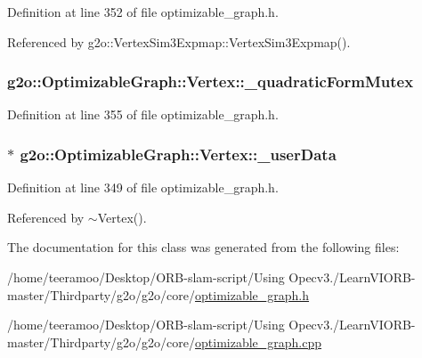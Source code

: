 Definition at line 352 of file optimizable\+\_\+graph.\+h.



Referenced by g2o\+::\+Vertex\+Sim3\+Expmap\+::\+Vertex\+Sim3\+Expmap().

\subsubsection[{\texorpdfstring{\+\_\+quadratic\+Form\+Mutex}{_quadraticFormMutex}}]{ g2o\+::\+Optimizable\+Graph\+::\+Vertex\+::\+\_\+quadratic\+Form\+Mutex\hspace{0.3cm}{\ttfamily [protected]}}\hypertarget{classg2o_1_1OptimizableGraph_1_1Vertex_ab9b85ddb487ad4818bc53e0c00ff7bcc}{}\label{classg2o_1_1OptimizableGraph_1_1Vertex_ab9b85ddb487ad4818bc53e0c00ff7bcc}


Definition at line 355 of file optimizable\+\_\+graph.\+h.

\subsubsection[{\texorpdfstring{\+\_\+user\+Data}{_userData}}]{$\ast$ g2o\+::\+Optimizable\+Graph\+::\+Vertex\+::\+\_\+user\+Data\hspace{0.3cm}{\ttfamily [protected]}}\hypertarget{classg2o_1_1OptimizableGraph_1_1Vertex_a71eb5fdfaf5c9a442135502e23504500}{}\label{classg2o_1_1OptimizableGraph_1_1Vertex_a71eb5fdfaf5c9a442135502e23504500}


Definition at line 349 of file optimizable\+\_\+graph.\+h.



Referenced by $\sim$\+Vertex().



The documentation for this class was generated from the following files\+:\begin{DoxyCompactItemize}
\item 
/home/teeramoo/\+Desktop/\+O\+R\+B-\/slam-\/script/\+Using Opecv3./\+Learn\+V\+I\+O\+R\+B-\/master/\+Thirdparty/g2o/g2o/core/\hyperlink{optimizable__graph_8h}{optimizable\+\_\+graph.\+h}\item 
/home/teeramoo/\+Desktop/\+O\+R\+B-\/slam-\/script/\+Using Opecv3./\+Learn\+V\+I\+O\+R\+B-\/master/\+Thirdparty/g2o/g2o/core/\hyperlink{optimizable__graph_8cpp}{optimizable\+\_\+graph.\+cpp}\end{DoxyCompactItemize}
